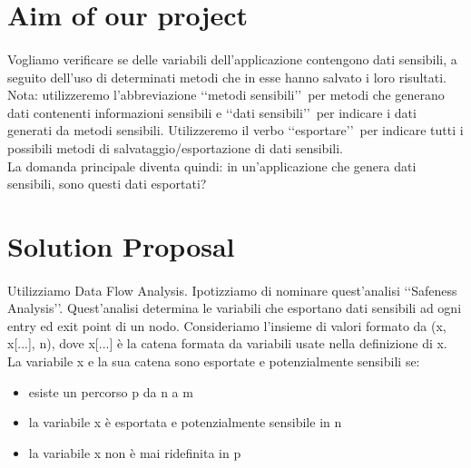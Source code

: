 \documentclass[letterpaper,twocolumn,10pt]{article}
\begin{document}

\section{Aim of our project}
\paragraph{}
Vogliamo verificare se delle variabili dell'applicazione contengono dati sensibili, a seguito dell'uso di determinati metodi che in esse hanno salvato i loro risultati.\\ 
Nota: utilizzeremo l'abbreviazione \lq\lq metodi sensibili\rq\rq\ per metodi che generano dati contenenti informazioni sensibili e \lq\lq dati sensibili\rq\rq\ per indicare i dati generati da metodi sensibili. Utilizzeremo il verbo \lq\lq esportare\rq\rq\ per indicare tutti i possibili metodi di salvataggio/esportazione di dati sensibili. \\
La domanda principale diventa quindi: in un'applicazione che genera dati sensibili, sono questi dati esportati? \\


\section{Solution Proposal}
\paragraph{}
Utilizziamo Data Flow Analysis. Ipotizziamo di nominare quest'analisi \lq\lq Safeness Analysis\rq\rq. Quest'analisi determina le variabili che esportano dati sensibili ad ogni entry ed exit point di un nodo. Consideriamo l'insieme di valori formato da (x, x[...], n), dove x[...] \`e la catena formata da variabili usate nella definizione di x. La variabile x e la sua catena sono esportate e potenzialmente sensibili se:
\begin{itemize}
\item esiste un percorso p da n a m
\item la variabile x \`e esportata e potenzialmente sensibile in n
\item la variabile x non \`e mai ridefinita in p
\end{itemize}
\end{document}
